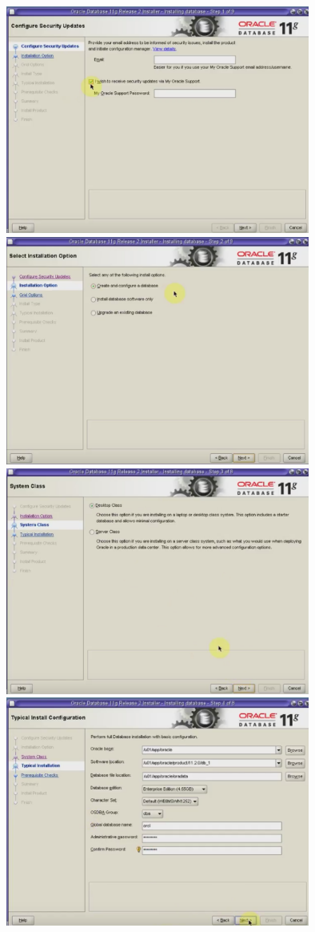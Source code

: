 \documentclass[a4paper,openright,12pt]{book}
\begin{document}
\begin{center}
\includegraphics[width=10cm]{./solari/11.png}\\
\includegraphics[width=10cm]{./solari/12.png}\\
\includegraphics[width=10cm]{./solari/13.png}\\
\includegraphics[width=10cm]{./solari/14.png}\\

\end{center}
\end{document}
